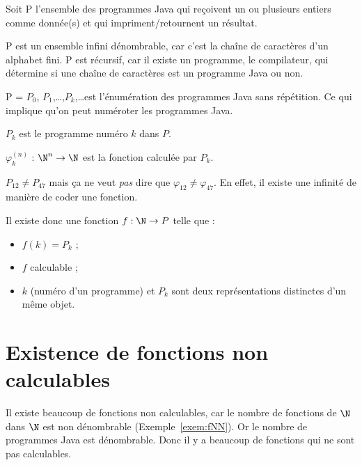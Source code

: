 \begin{mydef}[P]
	Soit P l'ensemble des programmes Java qui reçoivent un ou plusieurs entiers comme donnée(s) et qui impriment/retournent un résultat.
\end{mydef}

\begin{myprop}
	P est un ensemble infini dénombrable, car c'est la chaîne de caractères d'un alphabet fini. P est récursif, car il existe un programme, le compilateur, qui détermine si une chaîne de caractères est un programme Java ou non.
\end{myprop}

\begin{mydef}[Énumération de P]
	P = $P_0$, $P_1$,\dots,$P_k$,\dots est l'énumération des programmes Java sans répétition. Ce qui implique qu'on peut numéroter les programmes Java.\\
\end{mydef}

\begin{mydef}[$P_k$]
	$P_k$ est le programme numéro $k$ dans $P$.
\end{mydef}

\begin{mydef}[$\varphi^{(n)}_k$]
	$\varphi^{(n)}_k$ : $\N^n \rightarrow \N$ est la fonction calculée par $P_k$.
\end{mydef}

\begin{myrem}
  $P_{12} \neq P_{47}$ mais ça ne veut \emph{pas} dire que $\varphi_{12} \neq \varphi_{47}$. En effet, il existe une infinité de manière de coder une fonction.
\end{myrem}

\begin{myprop}
	Il existe donc une fonction $f : \N\rightarrow P$ telle que :
	\begin{itemize}
		\item $f(k) = P_k$ ;
		\item $f$ calculable ;
		\item $k$ (numéro d'un programme) et $P_k$ sont deux représentations
			distinctes d'un même objet.
	\end{itemize}
\end{myprop}


\section{Existence de fonctions non calculables}
\label{sec:existence_de_fonction_non_calculables}
Il existe beaucoup de fonctions non calculables, car le nombre de fonctions de $\N$ dans $\N$ est non dénombrable (Exemple~\ref{exem:fNN}).
Or le nombre de programmes Java est dénombrable.
Donc il y a beaucoup de fonctions qui ne sont pas calculables.

